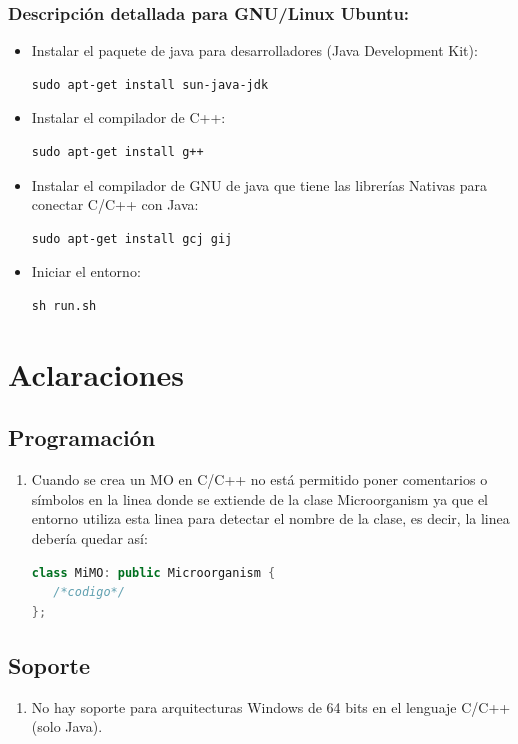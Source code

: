 \documentclass[11pt,a4paper]{article}
\begin{document}
\subsubsection{Descripción detallada para GNU/Linux Ubuntu:}
\begin{itemize}
\item     Instalar el paquete de java para desarrolladores (Java Development Kit):
\begin{lstlisting}[style=Code]
sudo apt-get install sun-java-jdk
\end{lstlisting}
\item     Instalar el compilador de C++:
\begin{lstlisting}[style=Code]
sudo apt-get install g++
\end{lstlisting}
            
\item     Instalar el compilador de GNU de java que tiene las librerías Nativas para conectar C/C++ con Java:
\begin{lstlisting}[style=Code]
sudo apt-get install gcj gij
\end{lstlisting}
\item     Iniciar el entorno:
\begin{lstlisting}[style=Code]
sh run.sh
\end{lstlisting}
           
\end{itemize}

\section{Aclaraciones}
\subsection{Programación}
	\begin{enumerate}
		\item  Cuando se crea un MO en C/C++ no está permitido poner comentarios o símbolos en la linea donde
	       se extiende de la clase Microorganism ya que el entorno utiliza esta linea para detectar el nombre de la clase,
    	   es decir, la linea debería quedar así:
\begin{lstlisting}[style=Code, language=C++]
class MiMO: public Microorganism {
   /*codigo*/
}; 
\end{lstlisting}
	\end{enumerate}      	       
\subsection{Soporte}
	\begin{enumerate}
		\item  No hay soporte para arquitecturas Windows de 64 bits en el lenguaje C/C++ (solo Java).    
	\end{enumerate}      
\end{document}

